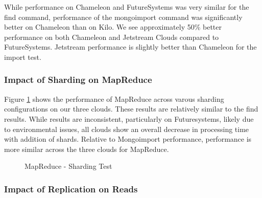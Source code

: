 \documentclass[sigconf]{acmart}
\begin{document}
While performance on Chameleon and FutureSystems was very similar for
the find command, performance of the mongoimport command was
significantly better on Chameleon than on Kilo.  We see approximately
50\% better performance on both Chameleon and Jetstream Clouds
compared to FutureSystems. Jetstream performance is slightly better
than Chameleon for the import test.


\subsubsection{Impact of Sharding on MapReduce}



Figure \ref{fig:shard-mapreduce} shows the performance of MapReduce
across varous sharding configurations on our three clouds.  These
results are relatively similar to the find results.  While results are
inconsistent, particularly on Futuresystems, likely due to
environmental issues, all clouds show an overall decrease in
processing time with addition of shards.  Relative to Mongoimport
performance, performance is more similar across the three clouds for
MapReduce.

\begin{figure}[htbp]
\centering
{}
\caption{MapReduce - Sharding Test}
\label{fig:shard-mapreduce}
\end{figure}


\subsubsection{Impact of Replication on Reads}
\end{document}
